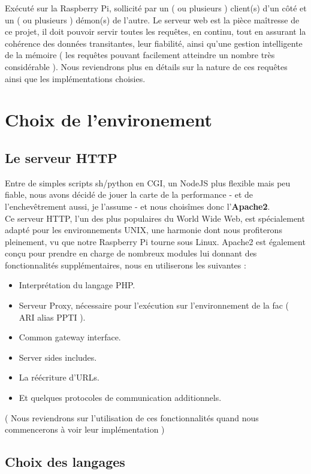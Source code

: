 Exécuté sur la Raspberry Pi, sollicité par un ( ou plusieurs ) client(s) d’un côté et un ( ou plusieurs ) démon(s) de l’autre. Le serveur web est la pièce maîtresse de ce projet, il doit pouvoir servir toutes les requêtes, en continu, tout en assurant la cohérence des données transitantes, leur fiabilité, ainsi qu’une gestion intelligente de la mémoire ( les requêtes pouvant facilement atteindre un nombre très considérable ). Nous reviendrons plus en détails sur la nature de ces requêtes ainsi que les implémentations choisies.

\section{Choix de l'environement}

\subsection{Le serveur HTTP}

Entre de simples scripts sh/python en CGI, un NodeJS plus flexible mais peu fiable, nous avons décidé de jouer la carte de la performance - et de l’enchevêtrement aussi, je l’assume - et nous choisîmes donc l’\textbf{Apache2}.\\
Ce serveur HTTP, l’un des plus populaires du World Wide Web, est spécialement adapté pour les environnements UNIX, une harmonie dont nous profiterons pleinement, vu que notre Raspberry Pi tourne sous Linux. Apache2 est également conçu pour prendre en charge de nombreux modules lui donnant des fonctionnalités supplémentaires, nous en utiliserons les suivantes :
\begin{itemize}
\item Interprétation du langage PHP.
\item Serveur Proxy, nécessaire pour l’exécution sur l’environnement de la fac ( ARI alias PPTI ).
\item Common gateway interface.
\item Server sides includes.
\item La réécriture d’URLs.
\item Et quelques protocoles de communication additionnels.
\end{itemize}
( Nous reviendrons sur l’utilisation de ces fonctionnalités quand nous commencerons à voir leur implémentation )

\subsection{Choix des langages}

